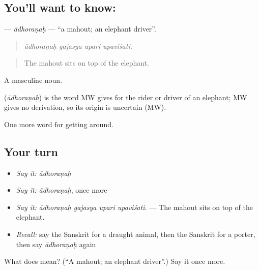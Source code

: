 \subsection*{You'll want to know: }
\textbf{} — \emph{ādhoraṇaḥ} — \textquotedblleft{}a mahout; an elephant driver\textquotedblright{}.

\begin{quote}
   
\end{quote}

\begin{quote}
\emph{ādhoraṇaḥ gajasya upari upaviśati.}
\end{quote}

\begin{quote}
The mahout sits on top of the elephant.
\end{quote}

A masculine noun.

\begin{cousinweb}
\textbf{} (\emph{ādhoraṇaḥ}) is the word MW gives for the rider or driver of an elephant; MW gives no derivation, so its origin is uncertain (MW).
\end{cousinweb}

\begin{grammarlens}[title={What you've built}]
One more word for getting around.
\end{grammarlens}

\subsection*{Your turn}
\begin{itemize}
\raggedright
  \item \emph{Say it:} \emph{ādhoraṇaḥ}
  \item \emph{Say it:} \emph{ādhoraṇaḥ}, once more
  \item \emph{Say it:} \emph{ādhoraṇaḥ gajasya upari upaviśati.} — The mahout sits on top of the elephant.
  \item \emph{Recall:} say the Sanskrit for a draught animal, then the Sanskrit for a porter, then say \emph{ādhoraṇaḥ} again
\end{itemize}

\begin{tcolorbox}[breakable,colback=teal!4,colframe=teal!35!black,title={Before you move on}]
What does  mean? (\textquotedblleft{}A mahout; an elephant driver\textquotedblright{}.) Say it once more.
\end{tcolorbox}
